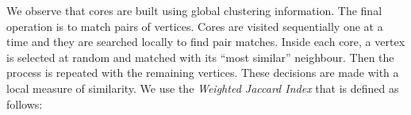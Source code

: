 \documentclass[twocolumn]{svjour3}          \smartqed
\begin{document}
	\begin{table}[t]
	\centering
	\caption{The final information system for clustering threshold .}\label{table:reduct_infosys2}

	\end{table}

We observe that cores are built using global clustering information. The final operation is to match pairs of vertices. Cores are visited sequentially one at a time and they are searched locally to find pair matches. Inside each core, a vertex  is selected at random and matched with its ``most similar'' neighbour.  Then the process is repeated with the remaining vertices.  These decisions are made with a local measure of similarity. We use the \textit{Weighted Jaccard Index} that is defined as follows:
\end{document}
